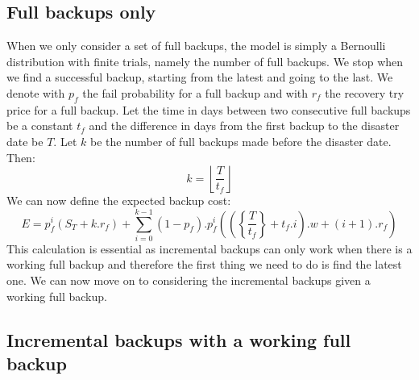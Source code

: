 \documentclass[11pt, a4paper]{article}
\theoremstyle{definition}
\begin{document}
		\subsection{Full backups only}
		When we only consider a set of full backups, the model is simply a Bernoulli distribution with finite trials, namely the number of full backups. We stop when we find a successful backup, starting from the latest and going to the last. We denote with $p_f$ the fail probability for a full backup and with $r_f$ the recovery try price for a full backup. Let the time in days between two consecutive full backups be a constant $t_f$ and the difference in days from the first backup to the disaster date be $T$. Let $k$ be the number of full backups made before the disaster date. Then:
		$$
			k = \left \lfloor{\frac{T}{t_f}}\right \rfloor
		$$
		We can now define the expected backup cost:
		\begin{equation}
			E = p_f^{i}\left(S_T + k.r_f\right) + \displaystyle \sum_{i=0}^{k-1} (1-p_f).p_f^{i}\left( \left(\left\{ \frac{T}{t_f}\right \} + t_f.i\right).w + (i+1).r_f \right )
		\end{equation}
		This calculation is essential as incremental backups can only work when there is a working full backup and therefore the first thing we need to do is find the latest one. We can now move on to considering the incremental backups given a working full backup.
		\subsection{Incremental backups with a working full backup}
\end{document}

